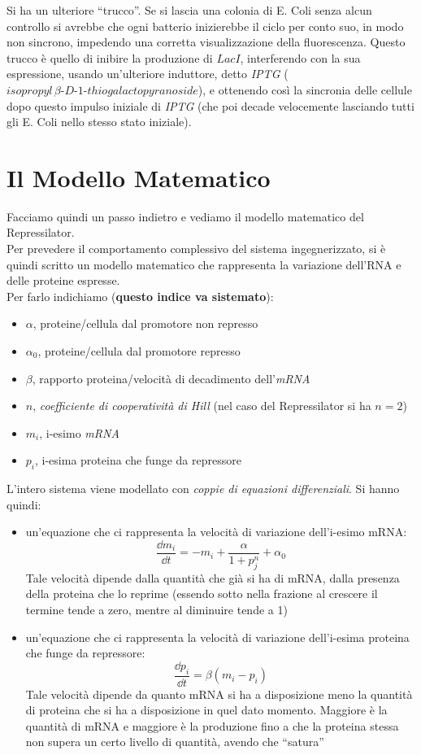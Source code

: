 \documentclass[a4paper,12pt, oneside]{book}
\begin{document}
Si ha un ulteriore ``trucco''. Se si lascia una colonia di E. Coli senza alcun
controllo si avrebbe che ogni batterio inizierebbe il ciclo per conto suo, in
modo non sincrono, impedendo una corretta visualizzazione della
fluorescenza. Questo trucco è quello di inibire la produzione di $LacI$,
interferendo con la sua espressione, usando
un'ulteriore induttore, detto \textit{IPTG} ($isopropyl
\,\beta\mbox{-}D\mbox{-}1\mbox{-}thiogalactopyranoside$), e ottenendo così la
sincronia delle  
cellule dopo questo impulso iniziale di \textit{IPTG} (che poi decade
velocemente lasciando tutti gli E. Coli nello stesso stato iniziale).
\section{Il Modello Matematico}
Facciamo quindi un passo indietro e vediamo il modello matematico del
Repressilator.\\
Per prevedere il comportamento complessivo del sistema ingegnerizzato, si è
quindi scritto un modello matematico che rappresenta la variazione 
dell'RNA e delle proteine espresse.\\
Per farlo indichiamo (\textbf{questo indice va sistemato}):
\begin{itemize}
  \item $\alpha$, proteine/cellula dal promotore non represso
  \item $\alpha_0$, proteine/cellula dal promotore represso
  \item $\beta$, rapporto proteina/velocità di decadimento dell'\textit{mRNA}
  \item $n$, \textit{coefficiente di cooperatività di Hill} (nel caso del
  Repressilator si ha $n=2$)
  \item $m_i$, i-esimo \textit{mRNA}
  \item $p_i$, i-esima proteina che funge da repressore
\end{itemize}
L'intero sistema viene modellato con \textit{coppie di equazioni
  differenziali}. Si hanno quindi: 
\begin{itemize}
  \item un'equazione che ci rappresenta la velocità di variazione dell'i-esimo
  mRNA:
  \[\frac{\dd{m_i}}{\dd{t}}=-m_i+\frac{\alpha}{1+p_j^n}+\alpha_0\]
  Tale velocità dipende dalla quantità che già si ha di mRNA, dalla presenza
  della proteina che lo reprime (essendo sotto nella frazione al crescere il
  termine tende a zero, mentre al diminuire tende a 1)
  \item un'equazione che ci rappresenta la velocità di variazione dell'i-esima
  proteina che funge da repressore:
  \[\frac{\dd{p_i}}{\dd{t}}=\beta(m_i-p_i)\]
  Tale velocità dipende da quanto mRNA si ha a disposizione meno la quantità di
  proteina che si ha a disposizione in quel dato momento. Maggiore è la
  quantità di mRNA e maggiore è la produzione fino a che la proteina stessa
  non supera un certo livello di quantità, avendo che ``satura''
\end{itemize}
\end{document}
